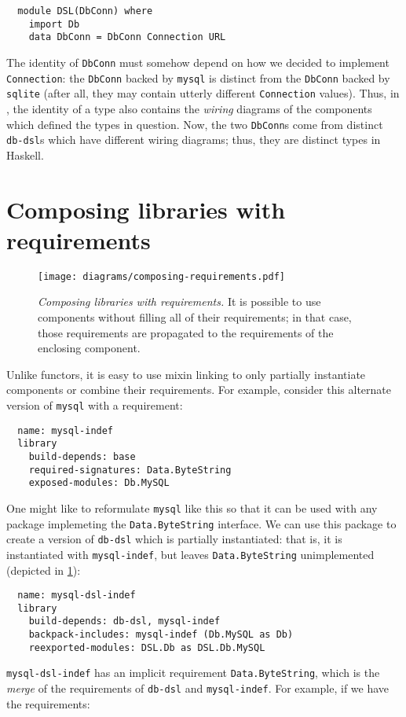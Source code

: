 \begin{verbatim}
  module DSL(DbConn) where
    import Db
    data DbConn = DbConn Connection URL
\end{verbatim}
%
The identity of \verb|DbConn| must somehow depend on how
we decided to implement \verb|Connection|: the \verb|DbConn| backed by
\verb|mysql| is distinct from the \verb|DbConn| backed by \verb|sqlite|
(after all, they may contain utterly different \verb|Connection| values).
Thus, in \Backpack{}, the identity of a type
also contains the \emph{wiring} diagrams of the components which
defined the types in question.  Now, the two \verb|DbConn|s come from
distinct \verb|db-dsl|s which have different wiring diagrams;
thus, they are distinct types in Haskell.

\section{Composing libraries with requirements}

\begin{figure}
\texttt{[image: diagrams/composing-requirements.pdf]}
\caption{\emph{Composing libraries with requirements.} It is possible
to use components without filling all of their requirements; in that
case, those requirements are propagated to the requirements of the
enclosing component.}
\label{fig:composing-requirements}
\end{figure}

Unlike functors, it is easy to use mixin linking to only partially
instantiate components or combine their requirements.  For example,
consider this alternate version of \verb|mysql| with a requirement:

\begin{verbatim}
  name: mysql-indef
  library
    build-depends: base
    required-signatures: Data.ByteString
    exposed-modules: Db.MySQL
\end{verbatim}
%
One might like to reformulate \verb|mysql| like this so that it can
be used with any package implemeting the \verb|Data.ByteString| interface.
We can use this package to create a version of \verb|db-dsl|
which is partially instantiated: that is, it is instantiated
with \verb|mysql-indef|, but leaves \verb|Data.ByteString|
unimplemented (depicted in \cref{fig:composing-requirements}):

\begin{verbatim}
  name: mysql-dsl-indef
  library
    build-depends: db-dsl, mysql-indef
    backpack-includes: mysql-indef (Db.MySQL as Db)
    reexported-modules: DSL.Db as DSL.Db.MySQL
\end{verbatim}
%
\verb|mysql-dsl-indef| has an implicit requirement
\verb|Data.ByteString|, which is the \emph{merge} of the
requirements of \verb|db-dsl| and \verb|mysql-indef|.  For
example, if we have the requirements:

